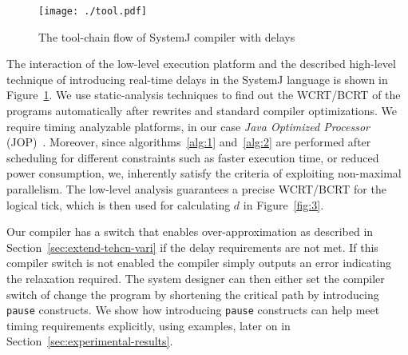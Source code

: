 \begin{figure}[h!]
  \centering
  \texttt{[image: ./tool.pdf]}
  \label{fig:4}
  \caption{The tool-chain flow of SystemJ compiler with delays}
\end{figure}

The interaction of the low-level execution platform and the described
high-level technique of introducing real-time delays in the SystemJ
language is shown in Figure~\ref{fig:4}. We use static-analysis
techniques to find out the WCRT/BCRT of the programs automatically after
rewrites and standard compiler optimizations. We require timing
analyzable platforms, in our case \textit{Java Optimized Processor}
(JOP)~\cite{jop:jnl:jsa2007}. Moreover, since algorithms~\ref{alg:1}
and~\ref{alg:2} are performed after scheduling for different constraints
such as faster execution time, or reduced power consumption, we,
inherently satisfy the criteria of exploiting non-maximal
parallelism. The low-level analysis guarantees a precise WCRT/BCRT for
the logical tick, which is then used for calculating $d$ in
Figure~\ref{fig:3}.

Our compiler has a switch that enables over-approximation as described
in Section~\ref{sec:extend-tehcn-vari} if the delay requirements are not
met. If this compiler switch is not enabled the compiler simply outputs
an error indicating the relaxation required. The system designer can
then either set the compiler switch of change the program by shortening
the critical path by introducing \texttt{pause} constructs. We show how
introducing \texttt{pause} constructs can help meet timing requirements
explicitly, using examples, later on in
Section~\ref{sec:experimental-results}.


